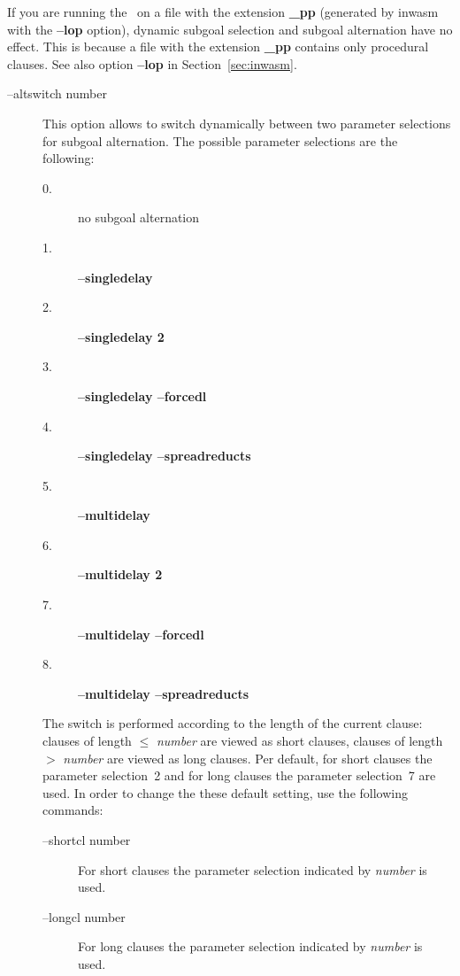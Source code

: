 \begin{remark}\label{rem:sgreord}
If you are running the \SAM\ on a file with the extension {\bf \_pp}
(generated by inwasm with the {\bf --lop} option), dynamic subgoal
selection and subgoal alternation have no effect. 
This is because a file with the extension {\bf \_pp} contains only
procedural clauses. 
See also option {\bf --lop} in Section~\ref{sec:inwasm}.
\end{remark}

\begin{description}
      \item [--altswitch number]
            This option allows to switch dynamically between two
            parameter selections for subgoal alternation. The possible
            parameter selections are the following: 
            \begin{description}
              \item [{\rm 0.}] no subgoal alternation
              \item [{\rm 1.}] {\bf --singledelay}
              \item [{\rm 2.}] {\bf --singledelay 2}
              \item [{\rm 3.}] {\bf --singledelay --forcedl}
              \item [{\rm 4.}] {\bf --singledelay --spreadreducts}
              \item [{\rm 5.}] {\bf --multidelay}
              \item [{\rm 6.}] {\bf --multidelay 2}
              \item [{\rm 7.}] {\bf --multidelay --forcedl}
              \item [{\rm 8.}] {\bf --multidelay --spreadreducts}
            \end{description}
            The switch is performed according to the length of the
            current clause: clauses of length $\leq$ {\it number\/}
            are viewed as short clauses, clauses of length $>$ {\it
            number\/} are viewed as long clauses. Per default, for
            short clauses the parameter selection~2 and for long
            clauses the parameter selection~7 are used.
            In order to change the these default setting, use the
            following commands:
            \begin{description}
              \item [--shortcl number]
                    For short clauses the parameter selection
                    indicated by {\it number} is used.
              \item [--longcl number]
                    For long clauses the parameter selection
                    indicated by {\it number} is used.
            \end{description}
\end{description}

